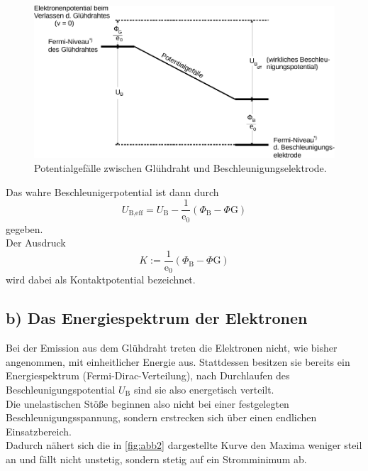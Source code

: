 \begin{figure}
    \centering
    \includegraphics{figures/Abb_3.pdf}
    \caption{Potentialgefälle zwischen Glühdraht und Beschleunigungselektrode\cite{ap08}.}
    \label{fig:abb3}
\end{figure}

Das wahre Beschleunigerpotential
ist dann durch
\begin{equation*}
    U_{\text{B},\text{eff}} = U_\text{B} - \frac{1}{\text{e}_0} (\Phi_\text{B} - \Phi\text{G})
\end{equation*}
gegeben. \\

Der Ausdruck
\begin{equation*}
    K := \frac{1}{\text{e}_0} (\Phi_\text{B} - \Phi\text{G})
\end{equation*}
wird dabei als Kontaktpotential bezeichnet.


\subsection*{b) Das Energiespektrum der Elektronen}

Bei der Emission aus dem Glühdraht treten die Elektronen nicht, wie bisher angenommen, mit einheitlicher Energie aus.
Stattdessen besitzen sie bereits ein Energiespektrum (Fermi-Dirac-Verteilung), nach Durchlaufen des Beschleunigungspotential $U_\text{B}$
sind sie also energetisch verteilt. \\

Die unelastischen Stöße beginnen also nicht bei einer festgelegten Beschleunigungsspannung, sondern erstrecken
sich über einen endlichen Einsatzbereich. \\

Dadurch nähert sich die in \autoref{fig:abb2} dargestellte Kurve den Maxima weniger steil an und fällt nicht
unstetig, sondern stetig auf ein Stromminimum ab. \\

